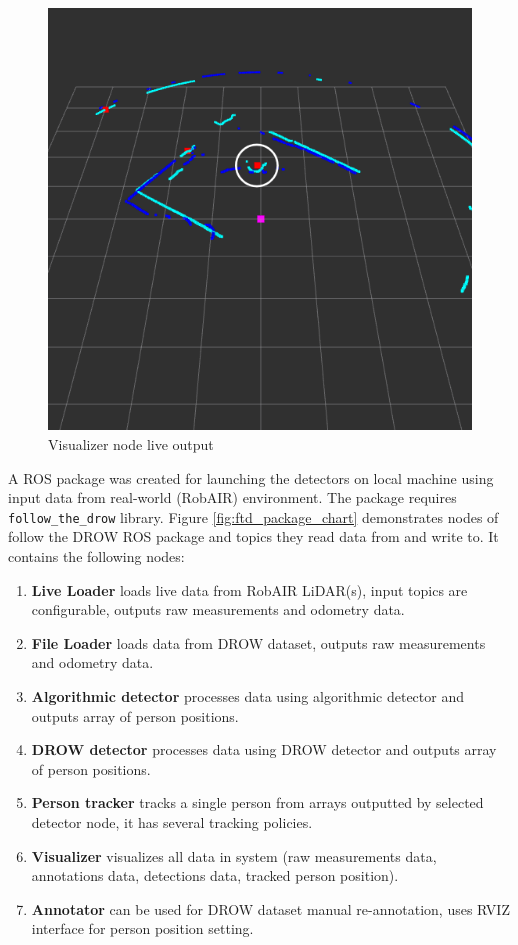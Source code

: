 \documentclass{article}
\begin{document}
\begin{figure}[b!]
	\centering
	\includegraphics[width=0.75\linewidth]{ftd_live_output}
	\caption{Visualizer node live output}
	\label{fig:visualizer_node_live}
\end{figure}

A ROS package was created for launching the detectors on local machine using input data from real-world (RobAIR) environment.
The package requires \texttt{follow\_the\_drow} library.
Figure \ref{fig:ftd_package_chart} demonstrates nodes of follow the DROW ROS package and topics they read data from and write to.
It contains the following nodes:

\begin{enumerate}
	\item \textbf{Live Loader} loads live data from RobAIR LiDAR(s), input topics are configurable, outputs raw measurements and odometry data.
	\item \textbf{File Loader} loads data from DROW dataset, outputs raw measurements and odometry data.
	\item \textbf{Algorithmic detector} processes data using algorithmic detector and outputs array of person positions.
	\item \textbf{DROW detector} processes data using DROW detector and outputs array of person positions.
	\item \textbf{Person tracker} tracks a single person from arrays outputted by selected detector node, it has several tracking policies.
	\item \textbf{Visualizer} visualizes all data in system (raw measurements data, annotations data, detections data, tracked person position).
	\item \textbf{Annotator} can be used for DROW dataset manual re-annotation, uses RVIZ interface for person position setting.
\end{enumerate}
\end{document}
